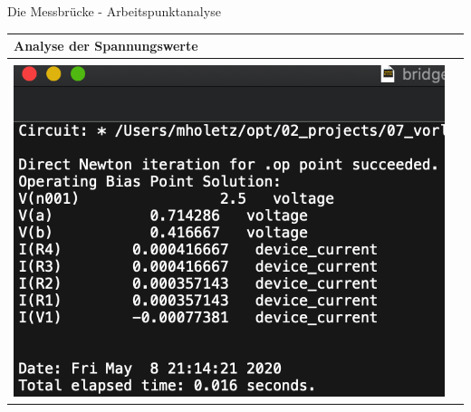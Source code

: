 \begin{frame}[t]{Die Messbrücke - Arbeitspunktanalyse}

  \begin{spacing}{0.9} \begin{tiny}
      \begin{table}[h!]
        \begin{tabular}{p{3cm} p{7cm}}
          \hline
          \textbf{Analyse der Spannungswerte} & \\
          \hline                                \\
          \begin{minipage}{.3\textwidth}
            \includegraphics[width=\linewidth]{pictures/log_1.png}
          \end{minipage}
                                              &
          \begin{minipage}{.7\textwidth}


\end{minipage}
\end{tabular}
\end{table}
\end{tiny}
\end{spacing}
\end{frame}
